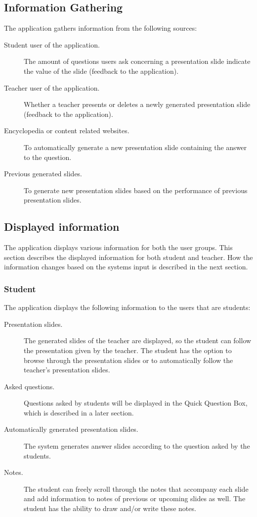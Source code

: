 \documentclass[11pt]{article}
\begin{document}
\subsection{Information Gathering}
The application gathers information from the following sources:
\begin{description}
\item[Student user of the application.] The amount of questions users ask concerning a presentation slide indicate the value of the slide (feedback to the application).
\item[Teacher user of the application.] Whether a teacher presents or deletes a newly generated presentation slide (feedback to the application).
\item[Encyclopedia or content related websites.] To automatically generate a new presentation slide containing the answer to the question.
\item[Previous generated slides.] To generate new presentation slides based on the performance of previous presentation slides.
\end{description}

\subsection{Displayed information}
The application displays various information for both the user groups. This section describes the displayed information for both student and teacher. How the information changes based on the systems input is described in the next section. 
\subsubsection{Student}
The application displays the following information to the users that are students:
\begin{description}
\item[Presentation slides.] The generated slides of the teacher are displayed, so the student can follow the presentation given by the teacher. The student has the option to browse through the presentation slides or to automatically follow the teacher’s presentation slides.
\item[Asked questions.] Questions asked by students will be displayed in the Quick Question Box, which is described in a later section. %
\item[Automatically generated presentation slides.] The system generates answer slides according to the question asked by the students.
\item[Notes.] The student can freely scroll through the notes that accompany each slide and add information to notes of previous or upcoming slides as well. The student has the ability to draw and/or write these notes.
\end{description}
\end{document}

